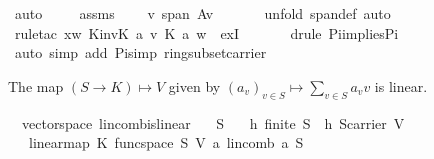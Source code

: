 \begin{isabellebody}
\ auto\isanewline
\ \ \isamarkupfalse%
\ {}{}\ assms\ \isamarkupfalse%
\ {}{}\ {\isacharcolon}\ {\isachardoublequoteopen}v{\isasymin}\ span\ {\isacharparenleft}A{\isacharminus}{\isacharbraceleft}v{\isacharbraceright}{\isacharparenright}{\isachardoublequoteclose}\ \isanewline
\ \ \ \ \isamarkupfalse%
\ {\isacharparenleft}unfold\ span{\isacharunderscore}def{\isacharcomma}\ auto{\isacharparenright}\ \isanewline
\ \ \ \ \isamarkupfalse%
\ {\isacharparenleft}rule{\isacharunderscore}tac\ x{\isacharequal}{\isachardoublequoteopen}{\isacharparenleft}{\isasymlambda}w{\isachardot}\ {\isasymominus}\isactrlbsub K\isactrlesub {\isacharparenleft}inv\isactrlbsub K\isactrlesub \ {\isacharparenleft}a\ v{\isacharparenright}{\isacharparenright}\ {\isasymotimes}\isactrlbsub K\isactrlesub \ a\ w{\isacharparenright}{\isachardoublequoteclose}\ \ exI{\isacharparenright}\ \isanewline
\ \ \ \ \isamarkupfalse%
\ {\isacharparenleft}drule\ Pi{\isacharunderscore}implies{\isacharunderscore}Pi{}{\isacharparenright}\isanewline
\ \ \ \ \isamarkupfalse%
\ {\isacharparenleft}auto\ simp\ add{\isacharcolon}\ Pi{\isacharunderscore}simp\ ring{\isacharunderscore}subset{\isacharunderscore}carrier{\isacharparenright}\isanewline
{}\isamarkupfalse%
%
\endisatagproof
{\isafoldproof}%
%
\isadelimproof
%
\endisadelimproof
%
\begin{isamarkuptext}%
The map $(S\to K)\mapsto V$ given by $(a_v)_{v\in S}\mapsto \sum_{v\in S} a_v v$ is linear.%
\end{isamarkuptext}%
\isamarkuptrue%
\isamarkupfalse%
\ {\isacharparenleft}\ vectorspace{\isacharparenright}\ lincomb{\isacharunderscore}is{\isacharunderscore}linear{\isacharcolon}\isanewline
\ \ \ S\isanewline
\ \ \ h{\isacharcolon}\ {\isachardoublequoteopen}finite\ S{\isachardoublequoteclose}\ \ h{}{\isacharcolon}\ {\isachardoublequoteopen}S{\isasymsubseteq}carrier\ V{\isachardoublequoteclose}\isanewline
\ \ \ {\isachardoublequoteopen}linear{\isacharunderscore}map\ K\ {\isacharparenleft}func{\isacharunderscore}space\ S{\isacharparenright}\ V\ {\isacharparenleft}{\isasymlambda}a{\isachardot}\ lincomb\ a\ S{\isacharparenright}{\isachardoublequoteclose}\ \isanewline
%
\isadelimproof
%
\endisadelimproof
%
\isatagproof
{}\isamarkupfalse%
\ {\isacharminus}\isanewline
\ \ \isamarkupfalse%

\end{isabellebody}
